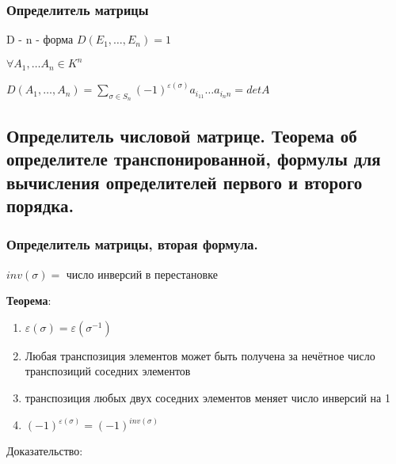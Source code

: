 \subsubsection{Определитель матрицы}

D - n - форма \(D(E_1,\ldots, E_n) =1 \)

\(\forall A_1,\ldots A_n \in K^n \)

\(D(A_1,\ldots,A_n)  = \sum\limits_{\sigma \in S_n} (-1)^{\varepsilon(\sigma)} a_{i_11}\ldots a_{i_nn} = det A\)

\subsection{Определитель числовой матрице. Теорема об определителе транспонированной, формулы для вычисления определителей первого и второго порядка.}

\subsubsection{ Определитель матрицы, вторая формула.}
\(inv(\sigma) = \) число инверсий в перестановке

\textbf{Теорема}:

\begin{enumerate}
    \item \(\varepsilon(\sigma) = \varepsilon(\sigma^{-1})\)
    \item Любая транспозиция элементов может быть получена за нечётное число транспозиций соседних элементов
    \item транспозиция любых двух соседних элементов меняет число инверсий на 1
    \item \((-1)^{\varepsilon(\sigma)}=(-1)^{inv(\sigma)}\)
\end{enumerate}

Доказательство:

